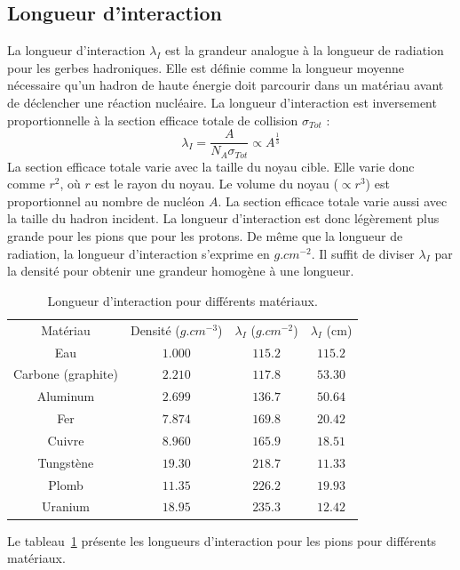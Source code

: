 \subsection{Longueur d'interaction}
\label{sec.intLen}
La longueur d'interaction $\lambda_I$ est la grandeur analogue à la longueur de radiation pour les gerbes hadroniques. Elle est définie comme la longueur moyenne nécessaire qu'un hadron de haute énergie doit parcourir dans un matériau avant de déclencher une réaction nucléaire. La longueur d'interaction est inversement proportionnelle à la section efficace totale de collision $\sigma_{Tot}$ \cite{wigmans}:
\begin{equation}
  \lambda_I=\frac{A}{N_A\sigma_{Tot}} \propto A^\frac{1}{3}
\end{equation}
La section efficace totale varie avec la taille du noyau cible. Elle varie donc comme $r^2$, où $r$ est le rayon du noyau. Le volume du noyau ($\propto r^3$) est proportionnel au nombre de nucléon $A$. La section efficace totale varie aussi avec la taille du hadron incident. La longueur d'interaction est donc légèrement plus grande pour les pions que pour les protons. De même que la longueur de radiation, la longueur d'interaction s'exprime en $g.cm^{-2}$. Il suffit de diviser $\lambda_I$ par la densité pour obtenir une grandeur homogène à une longueur. 

\begin{table}[!ht]
  \begin{center}
    \begin{tabular}{c|c|c|c}
      \rowcolor{black!20!white}Matériau & Densité ($g.cm^{-3}$) & $\lambda_I$ ($g.cm^{-2}$) & $\lambda_I$ (cm)\\
      \rowcolor{black!5!white}\hline
      \rowcolor{black!5!white}Eau & $1.000$ & $115.2$ & $115.2$ \\
      \rowcolor{black!5!white}Carbone (graphite) & $2.210$ & $117.8$ & $53.30$ \\
      \rowcolor{black!5!white}Aluminum & $2.699$ & $136.7$ & $50.64$ \\
      \rowcolor{black!5!white}Fer & $7.874$ & $169.8$ & $20.42$\\
      \rowcolor{black!5!white}Cuivre & $8.960$ & $165.9$ & $18.51$\\
      \rowcolor{black!5!white}Tungstène & $19.30$ & $218.7$ & $11.33$\\
      \rowcolor{black!5!white}Plomb & $11.35$ & $226.2$ & $19.93$\\
      \rowcolor{black!5!white}Uranium & $18.95$ & $235.3$ & $12.42$\\
    \end{tabular}
  \end{center}  
  \caption{Longueur d'interaction pour différents matériaux.}
  \label{tab.lI}
\end{table}
Le tableau~\ref{tab.lI} présente les longueurs d'interaction pour les pions pour différents matériaux.
\newpage
